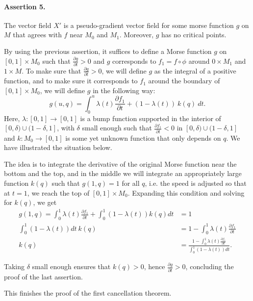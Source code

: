 \begin{myproof}
\paragraph{Assertion 5.}
The vector field $X'$ is a pseudo-gradient vector field for some morse function  $g$ on $M$ that agrees with $f$ near  $M_0$ and $M_1$.
Moreover, $g$ has no critical points.
\begin{myproof}
    By using the previous assertion,
    it suffices to define a Morse function $g$ on $[0, 1] \times M_0$ such that $\frac{\partial g}{\partial t} > 0$ and $g$ corresponds to  $ f_1 = f  \circ  \phi$ around $0 \times M_1$ and $1 \times M$.
    To make sure that $\frac{\partial g}{\partial t} > 0$, we will define $g$ as the integral of a positive function,
    and to make sure it corresponds to $f_1$ around the boundary of $[0,1] \times M_0$, we will define $g$ in the following way:
     \[
         g(u, q) = \int_0^{u} \lambda(t) \frac{\partial f_1}{\partial t} + (1-\lambda(t))\: k(q) \: dt
    .\] 
    Here, $\lambda: [0,1] \to  [0,1]$ is a bump function supported in the interior of $[0, \delta) \cup (1-\delta, 1]$, with $\delta$ small enough such that $\frac{\partial f_1}{\partial t}<0$ in $[0, \delta) \cup (1-\delta, 1]$ and $k: M_0 \to [0,1]$ is some yet unknown function that only depends on $q$.
    We have illustrated the situation below.
    \begin{figure}[H]
        \centering
    \end{figure}

    The idea is to integrate the derivative of the original Morse function near the bottom and the top, and in the middle we will integrate an appropriately large function $k(q)$ such that  $g(1, q) = 1$ for all $q$, i.e. the speed is adjusted so that at $t=1$, we reach the top of $[0,1] \times M_0$.
    Expanding this condition and solving for $k(q)$, we get
     \begin{align*}
         g(1, q) = \int_{0}^{1} \lambda(t) \frac{\partial f_1}{\partial t}  + \int_{0}^{1}  (1-\lambda(t)) k(q) dt &= 1\\
          \int_{0}^{1}  (1-\lambda(t))  dt \  k(q)&= 1 - \int_{0}^{1} \lambda(t) \frac{\partial f_1}{\partial t}\\
          k(q)&= \frac{1 - \int_{0}^{1} \lambda(t) \frac{\partial f_1}{\partial t}}{\int_{0}^{1}  (1-\lambda(t))  dt}
    .\end{align*} 

    Taking $\delta$ small enough ensures that  $k(q) > 0$, hence $\frac{\partial g}{\partial t}>0$, concluding the proof of the last assertion.
\end{myproof}

This finishes the proof of the first cancellation theorem.
\renewcommand{\qedsymbol}{\ensuremath{\square}}
\end{myproof}

